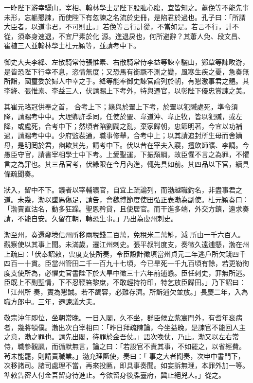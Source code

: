 \begin{pinyinscope}
 一昨陛下游幸驪山，宰相、翰林學士是陛下股肱心腹，宜皆知之。蕭俛等不能先事未形，忘軀懇諫，而使陛下有忽諫之名流於史冊，是陷君於過也。孔子曰：「所謂大臣者，以道事君，不可則止。」若俛等言行計從，不當如是。若言不行，計不從，須奉身速退，不宜尸素於化
 源。進退戾也，何所避辭？其蕭人免、段文昌、崔植三人並翰林學士杜元穎等，並請考中下。



 御史大夫李絳、左散騎常侍張惟素、右散騎常侍李益等諫幸驪山，鄭覃等諫畋游，是皆恐陛下行幸不息，恣情無度；又恐馬有銜蹶不測之變，風寒生疾之憂，急奏無所詣，國璽委於婦人中幸之手。絳等能率御史諫官論列於朝，有懇激事君之體。其李絳、張惟素、李益三人，伏請賜上下考外，特與遷官，以彰陛下優忠賞諫之美。



 其崔元略冠供奉之首，
 合考上下；緣與於翬上下考，於翬以犯贓處死，準令須降，請賜考中中。大理卿許季同，任使於翬、韋道沖、韋正牧，皆以犯贓，或左降，或處死，合考中下；然頃者陷劉闢之亂，棄家歸朝，忠節明著，今宜以功補過，請賜考中中。少府監裴通，職事修舉，合考中上；以其請追封所生母而舍嫡母，是明罔於君，幽欺其先，請考中下。伏以昔在宰夫入寢，擅飲師曠、李調。今愚臣守官，請書宰相學士中下考。上愛聖運，下振頹綱，故臣懼不言之為罪，不懼
 言之為罪也。其三品官考，伏緣限在今月內進，輒先具如前。其四品以下官，續具條疏聞奏。



 狀入，留中不下。議者以宰輔曠官，自宜上疏論列，而渤越職釣名，非盡事君之道。未幾，渤以墜馬傷足，請告，會魏博節度使田弘正表渤為副使。杜元穎奏曰：「渤賣直沽名，動多狂躁。聖恩矜貸，且使居官。而干進多端，外交方鎮，遠求奏請，不能自安。久留在朝，轉恐生事。」乃出為虔州刺史。



 渤至州，奏還鄰境信州所移兩稅錢二百萬，免稅米二萬斛，減
 所由一千六百人。觀察使以其事上聞。未滿歲，遷江州刺史。張平叔判度支，奏徵久遠逋懸，渤在州上疏曰：「伏奉詔敕，雲度支使所奏，令臣設計徵填當州貞元二年逃戶所欠錢四千四百一十貫。臣當州管田二千一百九十七頃，今已旱死一千九百頃有餘，若更勒徇度支使所為，必懼史官書陛下於大旱中徵三十六年前逋懸。臣任刺史，罪無所逃。臣既上不副聖情，下不忍鞭笞黎庶，不敢輕持符印，特乞放臣歸田。」乃下詔曰：「江州所
 奏，實為懇誠。若不蠲容，必難存濟。所訴逋欠並放。」長慶二年，入為職方郎中。三年，遷諫議大夫。



 敬宗沖年即位，坐朝常晚。一日入閣，久不坐，群臣候立紫宸門外，有耆年衰病者，幾將頓僕。渤出次白宰相曰：「昨日拜疏陳論，今坐益晚，是諫官不能回人主之意，渤之罪也。請先出閣，待罪於金吾仗。」語次喚仗，乃止。渤又以左右常侍，職參觀諷，而循默無言，論之曰：「若設官不責其事，不如罷之，以省經費。茍未能罷，則請責職業。」渤充理匭使，奏曰：「
 事之大者聞奏，次申中書門下，次移諸司。諸司處理不當，再來投匭，即具事奏聞。如妄訴無理，本罪外加一等。準敕告密人付金吾留身待進止。今欲留身後牒臺府，冀止絕兇人。」從之。




\end{pinyinscope}
